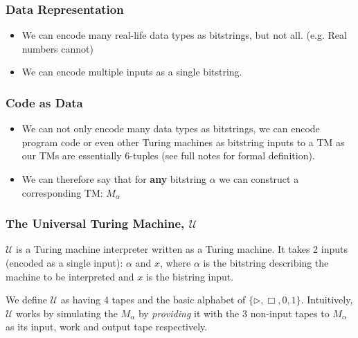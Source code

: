 \documentclass{beamer}
\newcommand{\U}{\mathcal{U}}
\begin{document}
\begin{frame}
  \frametitle{Data Representation}
  \begin{itemize}
    \item We can encode many real-life data types as bitstrings, but not all. (e.g. Real numbers cannot)
    \item We can encode multiple inputs as a single bitstring.
  \end{itemize}
\end{frame}

\begin{frame}
  \frametitle{Code as Data}
  \begin{itemize}
    \item We can not only encode many data types as bitstrings, we can encode program code or even other Turing machines as bitstring inputs to a TM as our TMs are essentially 6-tuples (see full notes for formal definition).
    \item We can therefore say that for \textbf{any} bitstring \(\alpha\) we can construct a corresponding TM:  $M_{\alpha}$
  \end{itemize}
\end{frame}

\begin{frame}
  \frametitle{The Universal Turing Machine, $\U$}

  $\U$ is a Turing machine interpreter written as a Turing machine. It takes 2 inputs (encoded as a single input): $\alpha$ and $x$, where $\alpha$ is the bitstring describing the machine to be interpreted and $x$ is the bistring input.

  We define $\U$ as having 4 tapes and the basic alphabet of $\{ \rhd, \Box, 0,1 \} $.  Intuitively, $\U$ works by simulating the $M_{\alpha}$ by \textit{providing} it with the 3 non-input tapes to $M_{\alpha}$ as its input, work and output tape respectively.
\end{frame}
\end{document}
